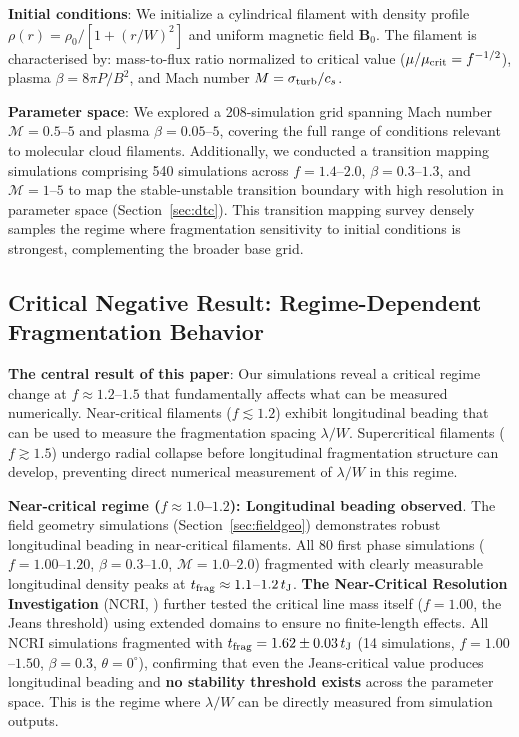 \documentclass[twoside,twocolumn]{mnras}
\begin{document}
\textbf{Initial conditions}: We initialize a cylindrical filament with density profile $\rho(r) = \rho_0 / [1 + (r/W)^2]$ and uniform magnetic field $\mathbf{B}_0$. The filament is characterised by: mass-to-flux ratio normalized to critical value ($\mu/\mu_{\rm crit} = f^{-1/2}$), plasma $\beta = 8\pi P/B^2$, and Mach number $M = \sigma_{\rm turb}/c_s$.

\textbf{Parameter space}: We explored a 208-simulation grid spanning Mach number $\mathcal{M} = 0.5$--$5$ and plasma $\beta = 0.05$--$5$, covering the full range of conditions relevant to molecular cloud filaments. Additionally, we conducted a transition mapping simulations  comprising 540 simulations across $f = 1.4$--$2.0$, $\beta = 0.3$--$1.3$, and $\mathcal{M} = 1$--$5$ to map the stable-unstable transition boundary with high resolution in parameter space (Section~\ref{sec:dtc}). This transition mapping survey densely samples the regime where fragmentation sensitivity to initial conditions is strongest, complementing the broader base grid.

\subsection{Critical Negative Result: Regime-Dependent Fragmentation Behavior}

\textbf{The central result of this paper}: Our simulations reveal a critical regime change at $f \approx 1.2$--$1.5$ that fundamentally affects what can be measured numerically. Near-critical filaments ($f \lesssim 1.2$) exhibit longitudinal beading that can be used to measure the fragmentation spacing $\lambda/W$. Supercritical filaments ($f \gtrsim 1.5$) undergo radial collapse before longitudinal fragmentation structure can develop, preventing direct numerical measurement of $\lambda/W$ in this regime.

\textbf{Near-critical regime ($f \approx 1.0$--$1.2$): Longitudinal beading observed}. The field geometry simulations (Section~\ref{sec:fieldgeo}) demonstrates robust longitudinal beading in near-critical filaments. All 80 first phase simulations ($f = 1.00$--$1.20$, $\beta = 0.3$--$1.0$, $\mathcal{M} = 1.0$--$2.0$) fragmented with clearly measurable longitudinal density peaks at $t_{\rm frag} \approx 1.1$--$1.2\,t_{\rm J}$. \textbf{The Near-Critical Resolution Investigation} (NCRI, ) further tested the critical line mass itself ($f = 1.00$, the Jeans threshold) using extended domains to ensure no finite-length effects. All NCRI simulations fragmented with $t_{\rm frag} = 1.62 \pm 0.03\,t_{\rm J}$ (14 simulations, $f = 1.00$--$1.50$, $\beta = 0.3$, $\theta = 0^{\circ}$), confirming that even the Jeans-critical value produces longitudinal beading and \textbf{no stability threshold exists} across the parameter space. This is the regime where $\lambda/W$ can be directly measured from simulation outputs.
\end{document}
